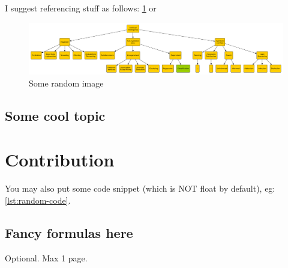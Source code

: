\documentclass[12pt,a4paper,openright,twoside]{book}
\begin{document}
I suggest referencing stuff as follows: \cref{fig:random-image} or 

\begin{figure}
    \centering
    \includegraphics[width=.8\linewidth]{figures/random-image.pdf}
    \caption{Some random image}
    \label{fig:random-image}
\end{figure}

\section{Some cool topic}

\chapter{Contribution}

You may also put some code snippet (which is NOT float by default), eg: \cref{lst:random-code}.



\section{Fancy formulas here}


\backmatter

\nocite{*} %




\begin{acknowledgements} %
Optional. Max 1 page.
\end{acknowledgements}
\end{document}
